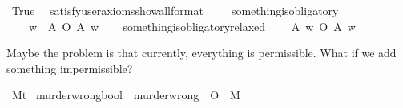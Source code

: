 \begin{isabellebody}
\isadelimdocument
%
\endisadelimdocument
%
\isatagdocument
%
\isamarkuptrue%
%
\endisatagdocument
{\isafolddocument}%
%
\isadelimdocument
%
\endisadelimdocument
{}\isamarkupfalse%
\ True\ \isamarkupfalse%
\ {\isacharbrackleft}satisfy{\isacharcomma}user{\isacharunderscore}axioms{\isacharcomma}show{\isacharunderscore}all{\isacharcomma}format{\isacharequal}{}{\isacharbrackright}%
\isadelimproof
\ %
\endisadelimproof
%
\isatagproof
{}\isamarkupfalse%
\ \isanewline
%
%
\endisatagproof
{\isafoldproof}%
%
\isadelimproof
%
\endisadelimproof
\isanewline
\isanewline
\isanewline
{}\isamarkupfalse%
\ something{\isacharunderscore}is{\isacharunderscore}obligatory{\isacharcolon}\isanewline
\ \ \ {\isachardoublequoteopen}{\isasymforall}\ w{\isachardot}\ {\isasymexists}\ A{\isachardot}\ O\ {\isacharbraceleft}A{\isacharbraceright}\ w{\isachardoublequoteclose}\isanewline
%
\isadelimproof
\ \ %
\endisadelimproof
%
\isatagproof
{}\isamarkupfalse%
\isanewline
%
\isanewline
%
%
\endisatagproof
{\isafoldproof}%
%
\isadelimproof
\isanewline
%
\endisadelimproof
\isanewline
{}\isamarkupfalse%
\ something{\isacharunderscore}is{\isacharunderscore}obligatory{\isacharunderscore}relaxed{\isacharcolon}\isanewline
\ \ \ {\isachardoublequoteopen}{\isasymexists}\ A\ w{\isachardot}\ O\ {\isacharbraceleft}A{\isacharbraceright}\ w{\isachardoublequoteclose}\isanewline
%
\isadelimproof
\ \ %
\endisadelimproof
%
\isatagproof
{}\isamarkupfalse%
\isanewline
%
%
\endisatagproof
{\isafoldproof}%
%
\isadelimproof
%
\endisadelimproof
%
\begin{isamarkuptext}%
Maybe the problem is that currently, everything is permissible. What if we add something impermissible?%
\end{isamarkuptext}\isamarkuptrue%
\isamarkupfalse%
\ M{\isacharcolon}{\isacharcolon}{\isachardoublequoteopen}t{\isachardoublequoteclose}\isanewline
{}\isamarkupfalse%
\ murder{\isacharunderscore}wrong{\isacharcolon}{\isacharcolon}{\isachardoublequoteopen}bool{\isachardoublequoteclose}\ \ {\isachardoublequoteopen}murder{\isacharunderscore}wrong\ {\isasymequiv}\ {\isasymTurnstile}{\isacharparenleft}O\ {\isacharbraceleft}\isactrlbold {\isasymnot}\ M{\isacharbraceright}{\isacharparenright}{\isachardoublequoteclose}\isanewline

\end{isabellebody}
